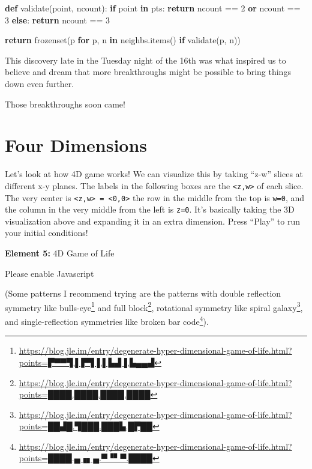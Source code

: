 \documentclass[]{article}
\newenvironment{Shaded}{}{}
\newcommand{\BuiltInTok}[1]{#1}
\newcommand{\ControlFlowTok}[1]{\textcolor[rgb]{0.00,0.44,0.13}{\textbf{#1}}}
\newcommand{\DecValTok}[1]{\textcolor[rgb]{0.25,0.63,0.44}{#1}}
\newcommand{\KeywordTok}[1]{\textcolor[rgb]{0.00,0.44,0.13}{\textbf{#1}}}
\newcommand{\NormalTok}[1]{#1}
\newcommand{\OperatorTok}[1]{\textcolor[rgb]{0.40,0.40,0.40}{#1}}
\renewcommand{\href}[2]{#2\footnote{\url{#1}}}
\begin{document}
\begin{Shaded}
\begin{Highlighting}[]
    \KeywordTok{def}\NormalTok{ validate(point, ncount):}
        \ControlFlowTok{if}\NormalTok{ point }\KeywordTok{in}\NormalTok{ pts:}
            \ControlFlowTok{return}\NormalTok{ ncount }\OperatorTok{==} \DecValTok{2} \KeywordTok{or}\NormalTok{ ncount }\OperatorTok{==} \DecValTok{3}
        \ControlFlowTok{else}\NormalTok{:}
            \ControlFlowTok{return}\NormalTok{ ncount }\OperatorTok{==} \DecValTok{3}

    \ControlFlowTok{return} \BuiltInTok{frozenset}\NormalTok{(p }\ControlFlowTok{for}\NormalTok{ p, n }\KeywordTok{in}\NormalTok{ neighbs.items() }\ControlFlowTok{if}\NormalTok{ validate(p, n))}
\end{Highlighting}
\end{Shaded}

This discovery late in the Tuesday night of the 16th was what inspired us to
believe and dream that more breakthroughs might be possible to bring things down
even further.

Those breakthroughs soon came!

\hypertarget{four-dimensions}{%
\section{Four Dimensions}\label{four-dimensions}}

Let's look at how 4D game works! We can visualize this by taking ``z-w'' slices
at different x-y planes. The labels in the following boxes are the
\texttt{\textless{}z,w\textgreater{}} of each slice. The very center is
\texttt{\textless{}z,w\textgreater{}\ =\ \textless{}0,0\textgreater{}} the row
in the middle from the top is \texttt{w=0}, and the column in the very middle
from the left is \texttt{z=0}. It's basically taking the 3D visualization above
and expanding it in an extra dimension. Press ``Play'' to run your initial
conditions!

\leavevmode\hypertarget{gol4D}{}%
\textbf{Element 5:} 4D Game of Life

\leavevmode\hypertarget{gol4DCont}{}%
Please enable Javascript

(Some patterns I recommend trying are the patterns with double reflection
symmetry like
\href{https://blog.jle.im/entry/degenerate-hyper-dimensional-game-of-life.html?points=▛▀▀▜.▌▛▜▐.▌▙▟▐.▙▄▄▟}{bulls-eye}
and
\href{https://blog.jle.im/entry/degenerate-hyper-dimensional-game-of-life.html?points=████.████.████.████}{full
block}, rotational symmetry like
\href{https://blog.jle.im/entry/degenerate-hyper-dimensional-game-of-life.html?points=██▟█.▜███.███▙.█▛██}{spiral
galaxy}, and single-reflection symmetries like
\href{https://blog.jle.im/entry/degenerate-hyper-dimensional-game-of-life.html?points=████.▄▗▖▄.▀▝▘▀.████}{broken
bar code}).
\end{document}
